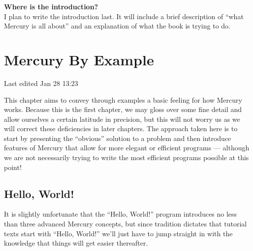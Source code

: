 \documentclass[a4paper,11pt,notitlepage,onecolumn]{book}
\begin{document}
\textbf{Where is the introduction?}
\\
I plan to write the introduction last.  It will include a brief description
of ``what Mercury is all about'' and an explanation of what the book is
trying to do.
\setcounter{chapter}{0}

\chapter{Mercury By Example}

Last edited Jan 28 13:23

This chapter aims to convey through examples a basic feeling for how
Mercury works.  Because this is the first chapter, we may gloss over some
fine detail and allow ourselves a certain latitude in precision, but this
will not worry us as we will correct these deficiencies in later chapters.
The approach taken here is to start by presenting the ``obvious'' solution
to a problem and then introduce features of Mercury that allow for more
elegant or efficient programs --- although we are not necessarily trying to
write the most efficient programs possible at this point! 



\section{Hello, World!}

It is slightly unfortunate that the ``Hello, World!'' program introduces
no less than three advanced Mercury concepts, but since tradition
dictates that tutorial texts start with ``Hello, World!'' we'll just
have to jump straight in with the knowledge that things will get easier
thereafter.
\end{document}
